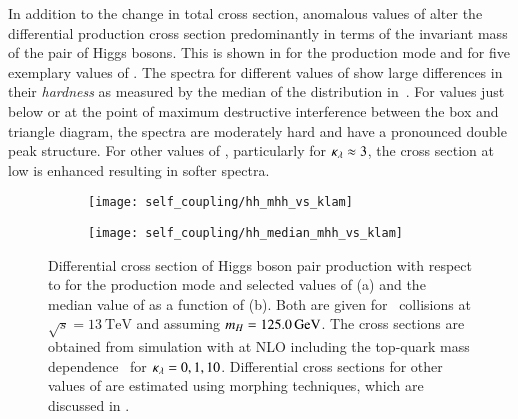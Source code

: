 In addition to the change in total cross section, anomalous values of \klambda
alter the differential \HH production cross section predominantly in terms of
the invariant mass of the pair of Higgs bosons. This is shown in
 for the \ggF production mode and for five exemplary
values of \klambda. The \mHH spectra for different values of \klambda show large
differences in their \emph{hardness} as measured by the median of the \mHH
distribution in~. For \klambda values just below or at
the point of maximum destructive interference between the box and triangle
diagram, the \mHH spectra are moderately hard and have a pronounced double peak
structure. For other values of \klambda, particularly for $\kappa_{\lambda} \approx 3$,
the cross section at low \mHH is enhanced resulting in softer \mHH spectra.

\begin{figure}[htbp]
  \begin{subfigure}[t]{0.485\textwidth}
    \texttt{[image: self\_coupling/hh\_mhh\_vs\_klam]}
    \subcaption{%
    }%
    \label{fig:hh_xsec_mhh}
  \end{subfigure}\hfill%
  \begin{subfigure}[t]{0.485\textwidth}
    \texttt{[image: self\_coupling/hh\_median\_mhh\_vs\_klam]}
    \subcaption{%
    }%
    \label{fig:hh_median_mhh}
  \end{subfigure}

  \caption[Differential cross section of Higgs boson pair production with
  respect to \mHH for the \ggF production mode and selected values of \klambda
  and the median value of \mHH as a function of \klambda.]{Differential cross
    section of Higgs boson pair production with respect to \mHH for the \ggF
    production mode and selected values of \klambda (a) and the median value of
    \mHH as a function of \klambda (b). Both are given for \pp~collisions at
    $\sqrt{s} = \SI{13}{\TeV}$ and assuming $m_{H} = \SI{125.0}{\ensuremath{\text{GeV}}}$. The cross
    sections are obtained from simulation with \POWHEGBOX[v2] at NLO including
    the top-quark mass dependence~\cite{Heinrich:2019bkc,Heinrich:2020ckp} for
    $\kappa_{\lambda} = 0, 1, 10$. Differential cross sections for other values of
    \klambda are estimated using morphing techniques, which are discussed in
    .}
  \label{fig:xsec_median_mhh}
\end{figure}

